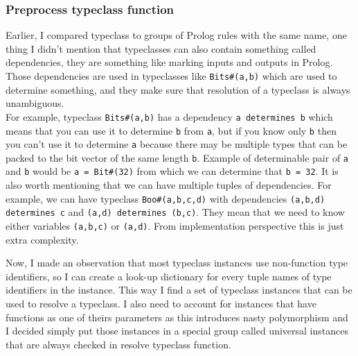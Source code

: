 \documentclass[14pt]{report}
\begin{document}
\subsubsection{Preprocess typeclass function}
Earlier, I compared typeclass to groups of Prolog rules with the same name, one thing I didn't mention that typeclasses can also contain something called dependencies, they are something like marking inputs and outputs in Prolog. Those dependencies are used in typeclasses like \verb!Bits#(a,b)! which are used to determine something, and they make sure that resolution of a typeclass is always unambiguous. \\
For example, typeclass \verb!Bits#(a,b)! has a dependency \verb!a determines b! which means that you can use it to determine \verb!b! from \verb!a!, but if you know only \verb!b! then you can't use it to determine \verb!a! because there may be multiple types that can be packed to the bit vector of the same length \verb!b!. Example of determinable pair of \verb!a! and \verb!b! would be  \verb!a = Bit#(32)! from which we can determine that \verb!b = 32!. It is also worth mentioning that we can have multiple tuples of dependencies. For example, we can have typeclass \verb!Boo#(a,b,c,d)! with dependencies \verb!(a,b,d) determines c! and \verb!(a,d) determines (b,c)!. They mean that we need to know either variables \verb!(a,b,c)! or \verb!(a,d)!. From implementation perspective this is just extra complexity.  
\par 
Now, I made an observation that most typeclass instances use non-function type identifiers, so I can create a look-up dictionary for every tuple names of type identifiers in the instance. This way I find a set of typeclass instances that can be used to resolve a typeclass. I also need to account for instances that have functions as one of theirs parameters as this introduces nasty polymorphism and I decided simply put those instances in a special group called universal instances that are always checked in resolve typeclass function. 
\end{document}
